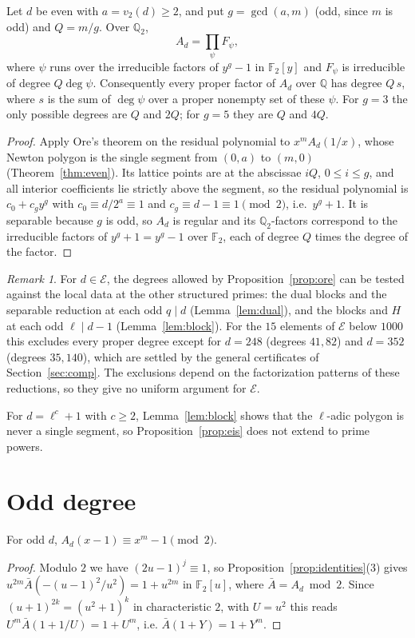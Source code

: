 \documentclass[11pt]{amsart}
\theoremstyle{definition}\newtheorem{definition}[theorem]{Definition}\newtheorem{example}[theorem]{Example}
\theoremstyle{remark}\newtheorem{remark}[theorem]{Remark}
\newcommand{\Q}{\mathbb Q}\newcommand{\Z}{\mathbb Z}\newcommand{\F}{\mathbb F}
\begin{document}
\begin{proposition}\label{prop:ore}
Let $d$ be even with $a=v_2(d)\ge2$, and put $g=\gcd(a,m)$ (odd, since $m$ is odd) and $Q=m/g$. Over $\Q_2$,
\[A_d=\prod_{\psi}F_\psi,\]
where $\psi$ runs over the irreducible factors of $y^g-1$ in $\F_2[y]$ and $F_\psi$ is irreducible of degree $Q\deg\psi$. Consequently every proper
factor of $A_d$ over $\Q$ has degree $Q\,s$, where $s$ is the sum of $\deg\psi$ over a proper nonempty set of these $\psi$. For $g=3$ the only possible
degrees are $Q$ and $2Q$; for $g=5$ they are $Q$ and $4Q$.
\end{proposition}
\begin{proof}
Apply Ore's theorem on the residual polynomial \cite{Ore,GMN} to $x^mA_d(1/x)$, whose Newton polygon is the single segment from $(0,a)$ to $(m,0)$
(Theorem~\ref{thm:even}). Its lattice points are at the abscissae $iQ$, $0\le i\le g$, and all interior coefficients lie strictly above the segment, so
the residual polynomial is $c_0+c_gy^g$ with $c_0\equiv d/2^a\equiv1$ and $c_g\equiv d-1\equiv1\pmod2$, i.e.\ $y^g+1$. It is separable because $g$
is odd, so $A_d$ is regular and its $\Q_2$-factors correspond to the irreducible factors of $y^g+1=y^g-1$ over $\F_2$, each of degree $Q$ times the
degree of the factor.
\end{proof}

\begin{remark}\label{rem:Estruct}
For $d\in\mathcal E$, the degrees allowed by Proposition~\ref{prop:ore} can be tested against the local data at the other structured primes: the
dual blocks and the separable reduction at each odd $q\mid d$ (Lemma~\ref{lem:dual}), and the blocks and $H$ at each odd $\ell\mid d-1$
(Lemma~\ref{lem:block}). For the $15$ elements of $\mathcal E$ below $1000$ this excludes every proper degree except for $d=248$ (degrees
$41,82$) and $d=352$ (degrees $35,140$), which are settled by the general certificates of Section~\ref{sec:comp}. The exclusions depend on the
factorization patterns of these reductions, so they give no uniform argument for $\mathcal E$.
\end{remark} For $d=\ell^c+1$ with $c\ge2$, Lemma~\ref{lem:block}
shows that the $\ell$-adic polygon is never a single segment, so Proposition~\ref{prop:eis} does not extend to prime powers.

\section{Odd degree}\label{sec:odd}
\begin{lemma}\label{lem:mod2}
For odd $d$, $A_d(x-1)\equiv x^m-1\pmod 2$.
\end{lemma}
\begin{proof}
Modulo $2$ we have $(2u-1)^j\equiv1$, so Proposition~\ref{prop:identities}(3) gives $u^{2m}\bar A(-(u-1)^2/u^2)=1+u^{2m}$ in $\F_2[u]$, where
$\bar A=A_d\bmod 2$. Since $(u+1)^{2k}=(u^2+1)^k$ in characteristic $2$, with $U=u^2$ this reads $U^m\bar A(1+1/U)=1+U^m$, i.e.
$\bar A(1+Y)=1+Y^m$.
\end{proof}
\end{document}
